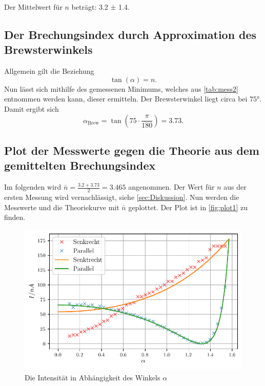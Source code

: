 Der Mittelwert für $n$ beträgt: 3.2 ± 1.4.


\subsection{Der Brechungsindex durch Approximation des Brewsterwinkels}

Allgemein gilt die Beziehung
\begin{equation*}
  \tan (\alpha) = n.
\end{equation*}
Nun lässt sich mithilfe des gemessenen Minimums, welches aus \autoref{tab:mess2} entnommen werden kann,
dieser ermitteln. Der Brewsterwinkel liegt circa bei $75 °$.
Damit ergibt sich
\begin{equation}
  \alpha_\text{Brew} = \tan \left( 75 \cdot \frac{\pi}{180} \right) = 3.73.
\end{equation}

\subsection{Plot der Messwerte gegen die Theorie aus dem gemittelten Brechungsindex}
Im folgenden wird $\bar{n} = \frac{3.2 + 3.73}{2} = 3.465$ angenommen.
Der Wert für $n$ aus der ersten Messung wird vernachlässigt, siehe \autoref{sec:Diskussion}.
Nun werden die Messwerte und die Theoriekurve mit $\bar{n}$ geplottet.
Der Plot ist in \autoref{fig:plot1} zu finden.

\begin{figure}
  \centering
  \caption{Die Intensität in Abhängigkeit des Winkels $\alpha$}
  \label{fig:plot1}
  \includegraphics[width=\linewidth]{build/plot1.pdf}
\end{figure}